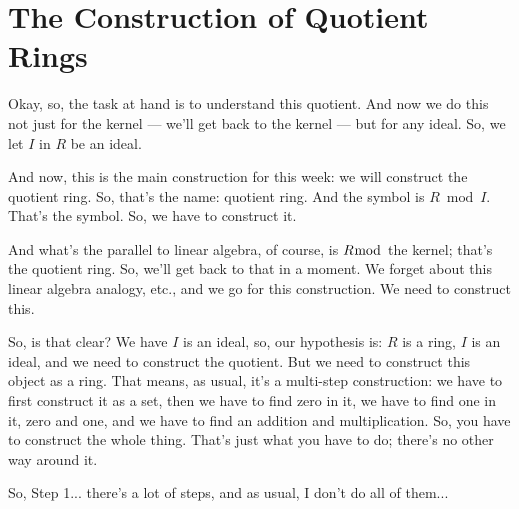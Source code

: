 \section{The Construction of Quotient Rings}

\begin{speech}[00:28:05 - 00:29:59]
Okay, so, the task at hand is to understand this quotient. And now we do this not just for the kernel --- we'll get back to the kernel --- but for any ideal. So, we let $I$ in $R$ be an ideal.  
 
And now, this is the main construction for this week: we will construct the quotient ring.  So, that's the name: quotient ring. And the symbol is $R \bmod I$.  That's the symbol. So, we have to construct it. 

And what's the parallel to linear algebra, of course, is $R \bmod$ the kernel; that's the quotient ring. So, we'll get back to that in a moment. We forget about this linear algebra analogy, etc., and we go for this construction. We need to construct this. 

So, is that clear? We have $I$ is an ideal, so, our hypothesis is: $R$ is a ring, $I$ is an ideal, and we need to construct the quotient. But we need to construct this object as a ring. That means, as usual, it's a multi-step construction: we have to first construct it as a set, then we have to find zero in it, we have to find one in it,  zero and one, and we have to find an addition and multiplication. So, you have to construct the whole thing. That's just what you have to do; there's no other way around it. 

So, Step 1... there's a lot of steps, and as usual, I don't do all of them... 
\end{speech}

